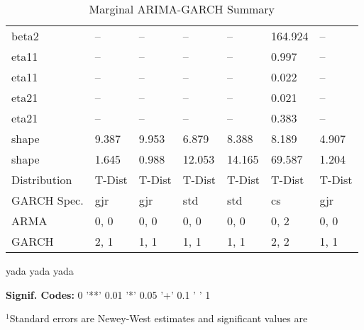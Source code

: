 \documentclass[12pt]{article}
\begin{document}
\begin{table}
\begin{tabular}{l l l l | l l l }
         beta2         &    -- &    -- &     -- &     -- & 164.924 &    --  \\
         eta11         &    -- &    -- &     -- &     -- &   0.997 &    --  \\
         eta11         &    -- &    -- &     -- &     -- &   0.022 &    --  \\
         eta21         &    -- &    -- &     -- &     -- &   0.021 &    --  \\
         eta21         &    -- &    -- &     -- &     -- &   0.383 &    --  \\
         shape         & 9.387 & 9.953 &  6.879 &  8.388 &   8.189 & 4.907  \\
         shape         & 1.645 & 0.988 & 12.053 & 14.165 &  69.587 & 1.204  \\
		 Distribution  & T-Dist& T-Dist& T-Dist & T-Dist &  T-Dist & T-Dist \\
		 GARCH Spec.   & gjr   &   gjr &    std &    std &      cs &  gjr   \\
		 ARMA          &  0, 0 &  0, 0 &   0, 0 &   0, 0 &    0, 2 &  0, 0  \\
		 GARCH         &  2, 1 &  1, 1 &   1, 1 &   1, 1 &    2, 2 &  1, 1  \\
		\midrule
	\end{tabular}
	\caption{Marginal ARIMA-GARCH Summary}
	\begin{tablenotes}
		\item{\footnotesize yada yada yada}
		\item{\footnotesize \textbf{Signif. Codes:} 0 '**' 0.01 '*' 0.05 '+' 0.1 ' ' 1}
		\item{\footnotesize $^{1}$Standard errors are Newey-West estimates and significant values are } 
	\end{tablenotes}
	\label{tbl:correlation_to_log_dtw_regression}
\end{table}
\end{document}
